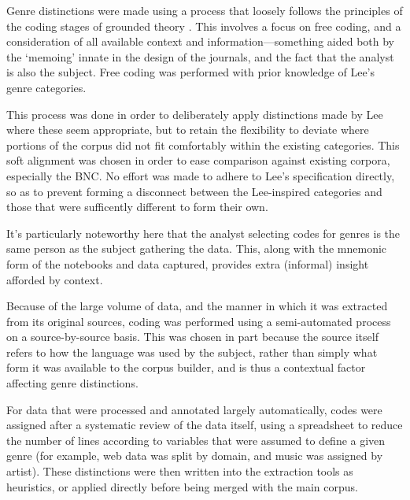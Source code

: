 
Genre distinctions were made using a process that loosely follows the principles of the coding stages of grounded theory .  
This involves a focus on free coding, and a consideration of all available context and information---something aided both by the `memoing' innate in the design of the journals, and the fact that the analyst is also the subject.  Free coding was performed with prior knowledge of Lee's genre categories.


This process was done in order to deliberately apply distinctions made by Lee where these seem appropriate, but to retain the flexibility to deviate where portions of the corpus did not fit comfortably within the existing categories.  This soft alignment was chosen in order to ease comparison against existing corpora, especially the BNC.  No effort was made to adhere to Lee's specification directly, so as to prevent forming a disconnect between the Lee-inspired categories and those that were sufficently different to form their own.

It's particularly noteworthy here that the analyst selecting codes for genres is the same person as the subject gathering the data.  This, along with the mnemonic form of the notebooks and data captured, provides extra (informal) insight afforded by context.


Because of the large volume of data, and the manner in which it was extracted from its original sources, coding was performed using a semi-automated process on a source-by-source basis.  This was chosen in part because the source itself refers to how the language was used by the subject, rather than simply what form it was available to the corpus builder, and is thus a contextual factor affecting genre distinctions.

For data that were processed and annotated largely automatically, codes were assigned after a systematic review of the data itself, using a spreadsheet to reduce the number of lines according to variables that were assumed to define a given genre (for example, web data was split by domain, and music was assigned by artist).  These distinctions were then written into the extraction tools as heuristics, or applied directly before being merged with the main corpus.

